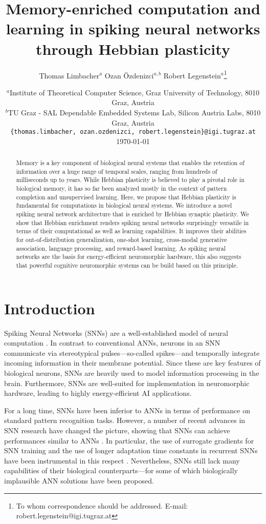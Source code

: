 \documentclass{article}
\title{Memory-enriched computation and learning in spiking neural networks through Hebbian plasticity}
\author{Thomas Limbacher$^a$ \And Ozan \"Ozdenizci$^{a,b}$ \And Robert Legenstein$^a$\thanks{To whom correspondence should be addressed. E-mail: robert.legenstein@igi.tugraz.at}}
\date{
	$^a$Institute of Theoretical Computer Science, Graz University of Technology, 8010 Graz, Austria \\
	$^b$TU Graz - SAL Dependable Embedded Systems Lab, Silicon Austria Labs, 8010 Graz, Austria \\[1ex]
	\texttt{\{thomas.limbacher, ozan.ozdenizci, robert.legenstein\}@igi.tugraz.at}\\[4ex]\today
}
\begin{document}
\maketitle

\begin{abstract}
Memory is a key component of biological neural systems that enables the retention of information over a huge range of temporal scales, ranging from hundreds of milliseconds up to years. While Hebbian plasticity is believed to play a pivotal role in biological memory, it has so far been analyzed mostly in the context of pattern completion and unsupervised learning. Here, we propose that Hebbian plasticity is fundamental for computations in biological neural systems. We introduce a novel spiking neural network architecture that is enriched by Hebbian synaptic plasticity. We show that Hebbian enrichment renders spiking neural networks surprisingly versatile in terms of their computational as well as learning capabilities. It improves their abilities for out-of-distribution generalization, one-shot learning, cross-modal generative association, language processing, and reward-based learning. As spiking neural networks are the basis for energy-efficient neuromorphic hardware, this also suggests that powerful cognitive neuromorphic systems can be build based on this principle.
\end{abstract}



\section{Introduction}
Spiking Neural Networks (SNNs) are a well-established model of neural computation \cite{maass2001pulsed}. In contrast to conventional \glspl{ANN}, neurons in an SNN communicate via stereotypical pulses---so-called spikes---and temporally integrate incoming information in their membrane potential. Since these are key features of biological neurons, SNNs are heavily used to model information processing in the brain. Furthermore, SNNs are well-suited for implementation in neuromorphic hardware, leading to highly energy-efficient AI applications. 

For a long time, SNNs have been inferior to \glspl{ANN} in terms of performance on standard pattern recognition tasks. However, a number of recent advances in SNN research have changed the picture, showing that SNNs can achieve performances similar to \glspl{ANN} \cite{tavanaei2019deep}. In particular, the use of surrogate gradients for SNN training \cite{bellec2018long,huh2018gradient,zenke2018superspike,neftci2019surrogate} and the use of longer adaptation time constants in recurrent SNNs have been instrumental in this respect \cite{salaj2021spike}. Nevertheless, SNNs still lack many capabilities of their biological counterparts---for some of which biologically implausible \gls{ANN} solutions have been proposed.  
\end{document}
